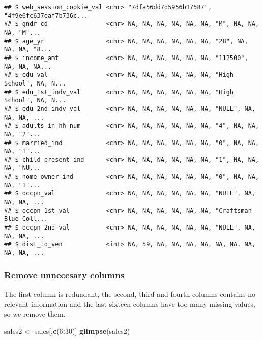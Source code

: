 \documentclass[]{article}
\newenvironment{Shaded}{\begin{snugshade}}{\end{snugshade}}
\newcommand{\DecValTok}[1]{\textcolor[rgb]{0.00,0.00,0.81}{#1}}
\newcommand{\KeywordTok}[1]{\textcolor[rgb]{0.13,0.29,0.53}{\textbf{#1}}}
\newcommand{\NormalTok}[1]{#1}
\newcommand{\OperatorTok}[1]{\textcolor[rgb]{0.81,0.36,0.00}{\textbf{#1}}}
\newcommand{\StringTok}[1]{\textcolor[rgb]{0.31,0.60,0.02}{#1}}
\begin{document}
\begin{verbatim}
## $ web_session_cookie_val <chr> "7dfa56dd7d5956b17587", "4f9e6fc637eaf7b736c...
## $ gndr_cd                <chr> NA, NA, NA, NA, NA, NA, "M", NA, NA, NA, "M"...
## $ age_yr                 <chr> NA, NA, NA, NA, NA, NA, "28", NA, NA, NA, "8...
## $ income_amt             <chr> NA, NA, NA, NA, NA, NA, "112500", NA, NA, NA...
## $ edu_val                <chr> NA, NA, NA, NA, NA, NA, "High School", NA, N...
## $ edu_1st_indv_val       <chr> NA, NA, NA, NA, NA, NA, "High School", NA, N...
## $ edu_2nd_indv_val       <chr> NA, NA, NA, NA, NA, NA, "NULL", NA, NA, NA, ...
## $ adults_in_hh_num       <chr> NA, NA, NA, NA, NA, NA, "4", NA, NA, NA, "2"...
## $ married_ind            <chr> NA, NA, NA, NA, NA, NA, "0", NA, NA, NA, "1"...
## $ child_present_ind      <chr> NA, NA, NA, NA, NA, NA, "1", NA, NA, NA, "NU...
## $ home_owner_ind         <chr> NA, NA, NA, NA, NA, NA, "0", NA, NA, NA, "1"...
## $ occpn_val              <chr> NA, NA, NA, NA, NA, NA, "NULL", NA, NA, NA, ...
## $ occpn_1st_val          <chr> NA, NA, NA, NA, NA, NA, "Craftsman Blue Coll...
## $ occpn_2nd_val          <chr> NA, NA, NA, NA, NA, NA, "NULL", NA, NA, NA, ...
## $ dist_to_ven            <int> NA, 59, NA, NA, NA, NA, NA, NA, NA, NA, NA, ...
\end{verbatim}

\hypertarget{remove-unnecesary-columns}{%
\subsubsection{Remove unnecesary
columns}\label{remove-unnecesary-columns}}

The first column is redundant, the second, third and fourth columns
contains no relevant information and the last sixteen columns have too
many missing values, so we remove them.

\begin{Shaded}
\begin{Highlighting}[]
\NormalTok{sales2 <-}\StringTok{ }\NormalTok{sales[,}\KeywordTok{c}\NormalTok{(}\DecValTok{6}\OperatorTok{:}\DecValTok{30}\NormalTok{)]}
\KeywordTok{glimpse}\NormalTok{(sales2)}
\end{Highlighting}
\end{Shaded}
\end{document}
